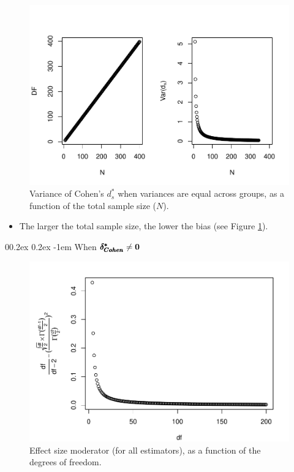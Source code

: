 \documentclass[
  english,
  man]{apa6}
\makeatletter
\providecommand{\tightlist}{%
  \setlength{\itemsep}{0pt}\setlength{\parskip}{0pt}}
\let\oldparagraph\paragraph
\renewcommand{\paragraph}[1]{\oldparagraph{#1}\mbox{}}
\renewcommand{\paragraph}{\@startsection{paragraph}{4}{\parindent}%
  {0\baselineskip \@plus 0.2ex \@minus 0.2ex}%
  {-1em}%
  {\normalfont\normalsize\bfseries\itshape\typesectitle}}
\makeatother
\begin{document}
\begin{figure}
\centering
\includegraphics{Theoretical-Variance-of-all-estimators-as-a-function-of-population-parameters_files/figure-latex/varcohendprimehomNsize2-1.pdf}
\caption{\label{fig:varcohendprimehomNsize2}Variance of Cohen's \(d^*_s\) when variances are equal across groups, as a function of the total sample size (\(N\)).}
\end{figure}

\begin{itemize}
\tightlist
\item
  The larger the total sample size, the lower the bias (see Figure \ref{fig:varcohendprimehomNsize2}).
\end{itemize}

\hypertarget{when-bf-pmbdelta_cohen-neq-0-1}{%
\paragraph{\texorpdfstring{When \(\bf \pmb{\delta^*_{Cohen}} \neq 0\)}{When \textbackslash bf \textbackslash pmb\{\textbackslash delta\^{}*\_\{Cohen\}\} \textbackslash neq 0}}\label{when-bf-pmbdelta_cohen-neq-0-1}}

\begin{figure}
\centering
\includegraphics{Theoretical-Variance-of-all-estimators-as-a-function-of-population-parameters_files/figure-latex/ESmoderator2-1.pdf}
\caption{\label{fig:ESmoderator2}Effect size moderator (for all estimators), as a function of the degrees of freedom.}
\end{figure}
\end{document}
